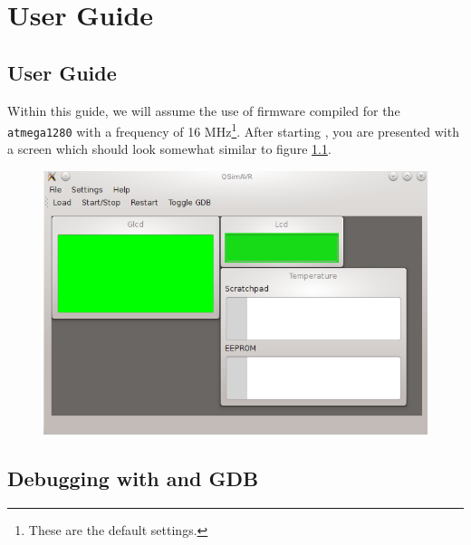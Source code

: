 
\chapter{User Guide}


\section{\qsimavr User Guide}

Within this guide, we will assume the use of firmware compiled for the
\verb|atmega1280| with a frequency of 16 \ac{MHz}\footnote{
%
These are the default settings.
%
}. After starting \qsimavr, you are presented with a screen which should look
somewhat similar to figure \ref{fig:qsimavr}.

\begin{figure}[ht]
\includegraphics[width=\textwidth]{images/qsimavr}
\caption{\qsimavr}
\label{fig:qsimavr}
\end{figure}


\section{Debugging with \simavr and \ac{GDB}} \label{section:debugging}

